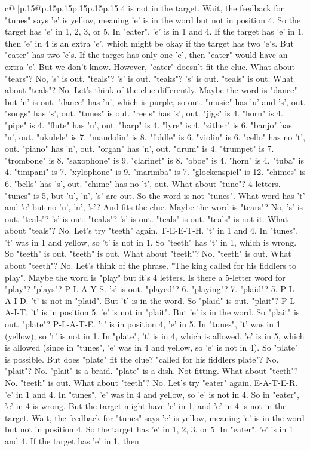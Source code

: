 \documentclass{article}
\begin{document}
{\begin{supertabular}{c@{$\;$}|p{.15\linewidth}@{}p{.15\linewidth}p{.15\linewidth}p{.15\linewidth}p{.15\linewidth}p{.15\linewidth}}
{{{4 is not in the target. Wait, the feedback for "tunes" says 'e' is yellow, meaning 'e' is in the word but not in position 4. So the target has 'e' in 1, 2, 3, or 5. In "eater", 'e' is in 1 and 4. If the target has 'e' in 1, then 'e' in 4 is an extra 'e', which might be okay if the target has two 'e's. But "eater" has two 'e's. If the target has only one 'e', then "eater" would have an extra 'e'. But we don't know. However, "eater" doesn't fit the clue. What about "tears"? No, 's' is out. "teals"? 's' is out. "teaks"? 's' is out. "teals" is out. What about "teals"? No. Let's think of the clue differently. Maybe the word is "dance" but 'n' is out. "dance" has 'n', which is purple, so out. "music" has 'u' and 's', out. "songs" has 's', out. "tunes" is out. "reels" has 's', out. "jigs" is 4. "horn" is 4. "pipe" is 4. "flute" has 'u', out. "harp" is 4. "lyre" is 4. "zither" is 6. "banjo" has 'n', out. "ukulele" is 7. "mandolin" is 8. "fiddle" is 6. "violin" is 6. "cello" has no 't', out. "piano" has 'n', out. "organ" has 'n', out. "drum" is 4. "trumpet" is 7. "trombone" is 8. "saxophone" is 9. "clarinet" is 8. "oboe" is 4. "horn" is 4. "tuba" is 4. "timpani" is 7. "xylophone" is 9. "marimba" is 7. "glockenspiel" is 12. "chimes" is 6. "bells" has 's', out. "chime" has no 't', out. What about "tune"? 4 letters. "tunes" is 5, but 'u', 'n', 's' are out. So the word is not "tunes". What word has 't' and 'e' but no 'u', 'n', 's'? And fits the clue. Maybe the word is "tears"? No, 's' is out. "teals"? 's' is out. "teaks"? 's' is out. "teals" is out. "teals" is not it. What about "teals"? No. Let's try "teeth" again. T{-}E{-}E{-}T{-}H. 't' in 1 and 4. In "tunes", 't' was in 1 and yellow, so 't' is not in 1. So "teeth" has 't' in 1, which is wrong. So "teeth" is out. "teeth" is out. What about "teeth"? No. "teeth" is out. What about "teeth"? No. Let's think of the phrase. "The king called for his fiddlers to play". Maybe the word is "play" but it's 4 letters. Is there a 5{-}letter word for "play"? "plays"? P{-}L{-}A{-}Y{-}S. 's' is out. "played"? 6. "playing"? 7. "plaid"? 5. P{-}L{-}A{-}I{-}D. 't' is not in "plaid". But 't' is in the word. So "plaid" is out. "plait"? P{-}L{-}A{-}I{-}T. 't' is in position 5. 'e' is not in "plait". But 'e' is in the word. So "plait" is out. "plate"? P{-}L{-}A{-}T{-}E. 't' is in position 4, 'e' in 5. In "tunes", 't' was in 1 (yellow), so 't' is not in 1. In "plate", 't' is in 4, which is allowed. 'e' is in 5, which is allowed (since in "tunes", 'e' was in 4 and yellow, so 'e' is not in 4). So "plate" is possible. But does "plate" fit the clue? "called for his fiddlers plate"? No. "plait"? No. "plait" is a braid. "plate" is a dish. Not fitting. What about "teeth"? No. "teeth" is out. What about "teeth"? No. Let's try "eater" again. E{-}A{-}T{-}E{-}R. 'e' in 1 and 4. In "tunes", 'e' was in 4 and yellow, so 'e' is not in 4. So in "eater", 'e' in 4 is wrong. But the target might have 'e' in 1, and 'e' in 4 is not in the target. Wait, the feedback for "tunes" says 'e' is yellow, meaning 'e' is in the word but not in position 4. So the target has 'e' in 1, 2, 3, or 5. In "eater", 'e' is in 1 and 4. If the target has 'e' in 1, then }}}
\end{supertabular}}
\end{document}
